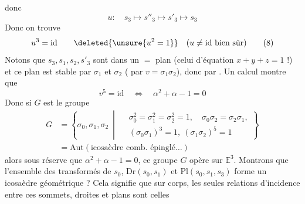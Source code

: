 donc
\[
u:\quad s_3\mapsto s''_3\mapsto s'_3\mapsto s_3\tag*{(7)}
\]
Donc on trouve
\[
u^3=\mathrm{id}\qquad\deleted{\unsure{u^2=1}}\quad(u\ne\mathrm{id}\ \text{bien sûr})\tag*{(8)}
\]
Notons que $s_3,s_1,s_2,s'_3$ sont dans un $=$ plan (celui d'équation $x+y+z=1$ !) et ce plan est stable par $\sigma_1$ et $\sigma_2$ ( par $v=\sigma_1\sigma_2$),  donc par . Un calcul  montre que
\[
v^5=\mathrm{id}\quad\Longleftrightarrow\quad\boxed{\alpha^2+\alpha-1=0}\tag*{(9)}
\]
Donc si $G$ est le groupe
\[
\begin{aligned}
G&=\left\{\sigma_0,\sigma_1,\sigma_2\ \middle|\ \begin{aligned}&\sigma_0^2=\sigma_1^2=\sigma_2^2=1,\quad\sigma_0\sigma_2=\sigma_2\sigma_1,\\&(\sigma_0\sigma_1)^3=1,\ (\sigma_1\sigma_2)^5=1\end{aligned}\right\}\\
&=\mathrm{Aut}(\text{icosaèdre comb. épinglé}\ldots)
\end{aligned}\tag*{(10)}
\]
alors sous réserve que $\alpha^2+\alpha-1=0$, ce groupe  $G$ opère  sur $\mathbb{E}^3$. Montrons que l'ensemble des transformés de $s_0$, $\mathrm{Dr}(s_0,s_1)$ et $\mathrm{Pl}(s_0,s_1,s_3)$ forme un icosaèdre géométrique ? Cela signifie que sur  corps, les seules relations d'incidence entre ces  sommets, droites et plans sont celles
